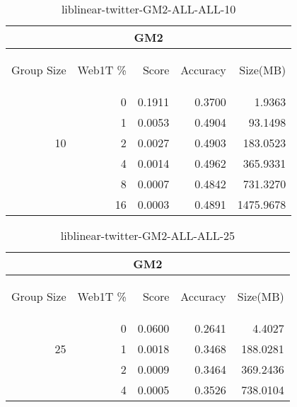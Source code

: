 \begin{center}
\begin{table}[htbp]
\begin{tabular}{ | r | r | r | r | r |}
\hline
\multicolumn{5}{|c|}{GM2}\\
\hline
\begin{sideways}Group Size\end{sideways} & \begin{sideways}Web1T \%\end{sideways} & \begin{sideways}Score\end{sideways} & \begin{sideways}Accuracy\end{sideways} & \begin{sideways}Size(MB)\end{sideways}\\
\hline
\multirow{5}{*}{10}
 & 0 & 0.1911 & 0.3700 & 1.9363\\ \cline{2-5}
 & 1 & 0.0053 & 0.4904 & 93.1498\\ \cline{2-5}
 & 2 & 0.0027 & 0.4903 & 183.0523\\ \cline{2-5}
 & 4 & 0.0014 & 0.4962 & 365.9331\\ \cline{2-5}
 & 8 & 0.0007 & 0.4842 & 731.3270\\ \cline{2-5}
 & 16 & 0.0003 & 0.4891 & 1475.9678\\ \cline{2-5}
\hline
\end{tabular}
\caption{liblinear-twitter-GM2-ALL-ALL-10}
\label{table:liblinear-twitter-GM2-ALL-ALL-10}
\end{table}
\end{center}

\begin{center}
\begin{table}[htbp]
\begin{tabular}{ | r | r | r | r | r |}
\hline
\multicolumn{5}{|c|}{GM2}\\
\hline
\begin{sideways}Group Size\end{sideways} & \begin{sideways}Web1T \%\end{sideways} & \begin{sideways}Score\end{sideways} & \begin{sideways}Accuracy\end{sideways} & \begin{sideways}Size(MB)\end{sideways}\\
\hline
\multirow{3}{*}{25}
 & 0 & 0.0600 & 0.2641 & 4.4027\\ \cline{2-5}
 & 1 & 0.0018 & 0.3468 & 188.0281\\ \cline{2-5}
 & 2 & 0.0009 & 0.3464 & 369.2436\\ \cline{2-5}
 & 4 & 0.0005 & 0.3526 & 738.0104\\ \cline{2-5}
\hline
\end{tabular}
\caption{liblinear-twitter-GM2-ALL-ALL-25}
\label{table:liblinear-twitter-GM2-ALL-ALL-25}
\end{table}
\end{center}

